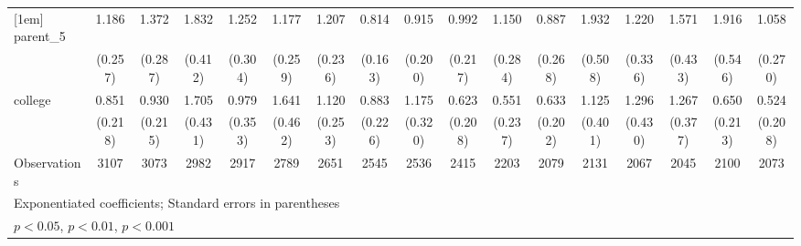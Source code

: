 {\begin{tabular}{l*{16}{c}}
[1em]
parent\_5            &       1.186         &       1.372         &       1.832\sym{**} &       1.252         &       1.177         &       1.207         &       0.814         &       0.915         &       0.992         &       1.150         &       0.887         &       1.932\sym{*}  &       1.220         &       1.571         &       1.916\sym{*}  &       1.058         \\
                    &     (0.257)         &     (0.287)         &     (0.412)         &     (0.304)         &     (0.259)         &     (0.236)         &     (0.163)         &     (0.200)         &     (0.217)         &     (0.284)         &     (0.268)         &     (0.508)         &     (0.336)         &     (0.433)         &     (0.546)         &     (0.270)         \\
[1em]
college             &       0.851         &       0.930         &       1.705\sym{*}  &       0.979         &       1.641         &       1.120         &       0.883         &       1.175         &       0.623         &       0.551         &       0.633         &       1.125         &       1.296         &       1.267         &       0.650         &       0.524         \\
                    &     (0.218)         &     (0.215)         &     (0.431)         &     (0.353)         &     (0.462)         &     (0.253)         &     (0.226)         &     (0.320)         &     (0.208)         &     (0.237)         &     (0.202)         &     (0.401)         &     (0.430)         &     (0.377)         &     (0.213)         &     (0.208)         \\
\hline
Observations        &        3107         &        3073         &        2982         &        2917         &        2789         &        2651         &        2545         &        2536         &        2415         &        2203         &        2079         &        2131         &        2067         &        2045         &        2100         &        2073         \\
\hline\hline
\multicolumn{17}{l}{\footnotesize Exponentiated coefficients; Standard errors in parentheses}\\
\multicolumn{17}{l}{\footnotesize \sym{*} \(p<0.05\), \sym{**} \(p<0.01\), \sym{***} \(p<0.001\)}\\
\end{tabular}
}
